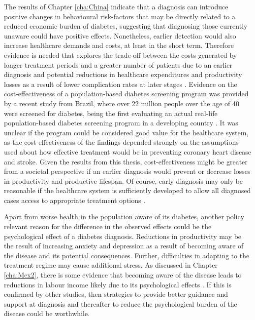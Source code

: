\DIFaddend The results of Chapter \ref{cha:China} indicate that a diagnosis can introduce positive changes in behavioural risk-factors that may be directly related to a reduced economic burden of diabetes, suggesting that diagnosing those currently unaware could have positive effects. Nonetheless, earlier detection would also increase healthcare demands and costs, at least in the short term. Therefore evidence is needed that explores the trade-off between the costs generated by longer treatment periods and a greater number of patients due to an earlier diagnosis and potential reductions in healthcare expenditures and productivity losses as a result of lower complication rates at later stages \parencite{Engelgau2012}. Evidence on the cost-effectiveness of a population-based diabetes screening program was provided by a recent study from Brazil, where over 22 million people over the age of 40 were screened for diabetes, being the first evaluating an actual real-life population-based diabetes screening program in a developing country \parencite{Toscano2015}. It was unclear if the program could be considered good value for the healthcare system, as the cost-effectiveness of the findings depended strongly on the assumptions used about how effective treatment would be in preventing coronary heart disease and stroke. Given the results from this thesis, cost-effectiveness might be greater from a societal perspective if an earlier diagnosis would prevent or decrease losses in productivity and productive lifespan. Of course, early diagnosis may only be reasonable if the healthcare system is sufficiently developed to allow all diagnosed cases access to appropriate treatment options \parencite{Toscano2015,Engelgau2012}. 

Apart from worse health in the population aware of its diabetes, another policy relevant reason for the difference in the observed effects could be the psychological effect of a diabetes diagnosis. Reductions in productivity may be the result of increasing anxiety and depression as a result of becoming aware of the disease and its potential consequences. Further, difficulties in adapting to the treatment regime may cause additional stress. As discussed in Chapter \ref{cha:Mex2}, there is some evidence that becoming aware of the disease leads to reductions in labour income likely due to its psychological effects \parencite{Liu2014}. If this is confirmed by other studies, then strategies to provide better guidance and support at diagnosis and thereafter to reduce the psychological burden of the disease could be worthwhile.



